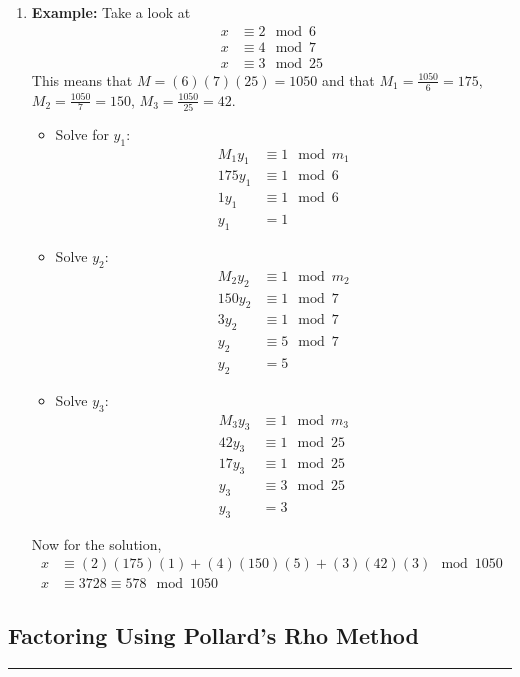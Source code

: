 \documentclass[class=article, crop=false]{standalone}
\begin{document}
\begin{enumerate}[1.]
	\item \textbf{Example:} Take a look at
	\begin{align*}
		x &\equiv 2\mod 6 \\
		x &\equiv 4\mod 7 \\
		x &\equiv 3\mod 25
	\end{align*}
	This means that $M=(6)(7)(25)=1050$ and that $M_1 = \frac{1050}{6}=175$, $M_2 = \frac{1050}{7}=150$,
	$M_3 = \frac{1050}{25}=42$.
	\begin{itemize}
		\item[] Solve for $y_1$:
		\begin{align*}
			M_1 y_1 &\equiv 1\mod m_1 \\
			175 y_1 &\equiv 1\mod 6 \\
			1y_1 &\equiv 1\mod 6 \\
			y_1 &= 1
		\end{align*}
		
		\item[] Solve $y_2$: \begin{align*}
			M_2 y_2 &\equiv 1\mod m_2 \\
			150 y_2 &\equiv 1\mod 7 \\
			3y_2 &\equiv 1\mod 7 \\
			y_2 &\equiv 5\mod 7 \\
			y_2 &= 5
		\end{align*}

		\item[] Solve $y_3$: \begin{align*}
			M_3 y_3 &\equiv 1\mod m_3 \\
			42 y_3 &\equiv 1\mod 25 \\
			17y_3 &\equiv 1\mod 25 \\
			y_3 &\equiv 3\mod 25 \\
			y_3 &= 3
		\end{align*}
	\end{itemize}
	Now for the solution,
	\begin{align*}
		x&\equiv(2)(175)(1) + (4)(150)(5) + (3)(42)(3)\mod 1050 \\
		x &\equiv 3728\equiv 578\mod 1050
	\end{align*}
	
\end{enumerate}

\subsection{Factoring Using Pollard's Rho Method}
\rule{\textwidth}{1pt}
\end{document}
